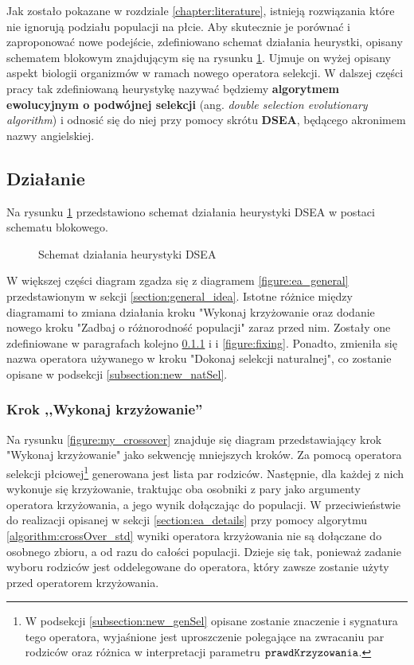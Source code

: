 \documentclass[./FM_mgr.tex]{subfiles}
\begin{document}
Jak zostało pokazane w rozdziale \ref{chapter:literature}, istnieją rozwiązania które nie ignorują podziału populacji na płcie. 
Aby skutecznie je porównać i zaproponować nowe podejście, zdefiniowano schemat działania heurystki, opisany schematem blokowym znajdującym się na rysunku \ref{figure:dsea}. Ujmuje on wyżej opisany aspekt biologii organizmów w ramach nowego operatora selekcji. 
W dalszej części pracy tak zdefiniowaną heurystykę nazywać będziemy \textbf{algorytmem ewolucyjnym o podwójnej selekcji} (ang. \emph{double selection evolutionary algorithm}) i odnosić się do niej przy pomocy skrótu \textbf{DSEA}, będącego akronimem nazwy angielskiej.

\subsection{Działanie} \label{subsection:dsea_scheme}

Na rysunku \ref{figure:dsea} przedstawiono schemat działania heurystyki DSEA w postaci schematu blokowego. 

\begin{figure}[H]
	\caption{Schemat działania heurystyki DSEA \label{figure:dsea}}
\end{figure}

W większej części diagram zgadza się z diagramem \ref{figure:ea_general} przedstawionym w sekcji \ref{section:general_idea}. 
Istotne różnice między diagramami to zmiana działania kroku "Wykonaj krzyżowanie oraz dodanie nowego kroku "Zadbaj o różnorodność populacji" zaraz przed nim. 
Zostały one zdefiniowane w paragrafach kolejno \ref{subsubsection:my_crossover} i  i \ref{figure:fixing}. 
Ponadto, zmieniła się nazwa operatora używanego w kroku "Dokonaj selekcji naturalnej", co zostanie opisane w podsekcji \ref{subsection:new_natSel}.

\subsubsection{Krok ,,Wykonaj krzyżowanie''} \label{subsubsection:my_crossover}


Na rysunku \ref{figure:my_crossover} znajduje się diagram przedstawiający krok "Wykonaj krzyżowanie" jako sekwencję mniejszych kroków. Za pomocą operatora selekcji płciowej\footnote{
	W podsekcji \ref{subsection:new_genSel} opisane zostanie znaczenie i sygnatura tego operatora, wyjaśnione jest uproszczenie polegające na zwracaniu par rodziców oraz różnica w interpretacji parametru $\mathtt{prawdKrzyzowania}$. 
} generowana jest lista par rodziców. 
Następnie, dla każdej z nich wykonuje się krzyżowanie, traktując oba osobniki z pary jako argumenty operatora krzyżowania, a jego wynik dołączając do populacji. 
W przeciwieństwie do realizacji opisanej w sekcji \ref{section:ea_details} przy pomocy algorytmu \ref{algorithm:crossOver_std} wyniki operatora krzyżowania nie są dołączane do osobnego zbioru, a od razu do całości populacji. 
Dzieje się tak, ponieważ zadanie wyboru rodziców jest oddelegowane do operatora, który zawsze zostanie użyty przed operatorem krzyżowania.
\end{document}
